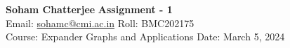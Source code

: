 \documentclass[a4paper, 11pt]{article}
\begin{document}
	
	
	\textsf{\noindent \large\textbf{Soham Chatterjee} \hfill \textbf{Assignment - 1}\\
		Email: \href{sohamc@cmi.ac.in}{sohamc@cmi.ac.in} \hfill Roll: BMC202175\\
		\normalsize Course: Expander Graphs and Applications \hfill Date: March 5, 2024}
	
	
\end{document}
